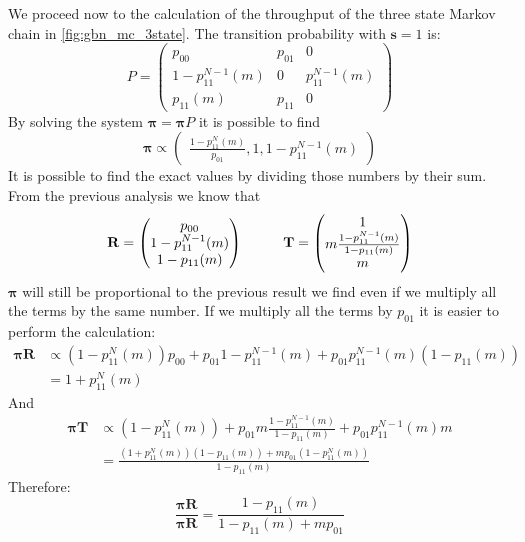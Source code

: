 We proceed now to the calculation of the throughput of the three state Markov chain in \autoref{fig:gbn_mc_3state}. The transition probability with $\mathbf{s} = 1$ is:
$$P=
\begin{pmatrix}
		p_{00} & p_{01} & 0 \\
		1-p_{11}^{N-1}(m) & 0 & p_{11}^{N-1}(m) \\
		p_{11}(m) & p_{11} & 0
\end{pmatrix} $$
By solving the system $\mathbf{\pi} = \mathbf{\pi}P$ it is possible to find
$$
	\mathbf{\pi} \propto
	\begin{pmatrix}
		\frac{1-p_{11}^N(m)}{p_{01}} , 1 , 1-p_{11}^{N-1}(m)
	\end{pmatrix}
$$
It is  possible to find the exact values by dividing those numbers by their sum. From the previous analysis we know that
$$\mathbf{R} =
\begin{pmatrix}
		p_{00}\\
	  1-p_{11}^{N-1}(m) \\
		1-p_{11}(m)
\end{pmatrix} \hspace{1 cm}
\mathbf{T} =
\begin{pmatrix}
		1 \\
		m \frac{1-p_{11}^{N-1}(m)}{1-p_{11}(m)} \\
		m
\end{pmatrix} $$
$\mathbf{\pi}$ will still be proportional to the previous result we find even if we multiply all the  terms by the same number. If we multiply all the terms by $p_{01}$ it is easier to perform the calculation:
\begin{equation}
	\begin{split}
		\mathbf{\pi}\mathbf{R} &\propto  (1-p_{11}^N(m))p_{00} + p_{01}1-p_{11}^{N-1}(m) + p_{01}p_{11}^{N-1}(m)(1-p_{11}(m))\\
		&= 1 + p_{11}^N(m)
	\end{split}
\end{equation}
And
\begin{equation}
	\begin{split}
		\mathbf{\pi}\mathbf{T} &\propto (1-p_{11}^N(m)) + p_{01}m\frac{1-p_{11}^{N-1}(m)}{1-p_{11}(m)} + p_{01}p_{11}^{N-1}(m)m\\
		&=\frac{(1 + p_{11}^N(m))(1-p_{11}(m))+mp_{01}(1-p_{11}^N(m))}{1-p_{11}(m)}
	\end{split}
\end{equation}
Therefore:
\begin{equation}
		\frac{\mathbf{\pi}\mathbf{R}}{\mathbf{\pi}\mathbf{R}} = \frac{1-p_{11}(m)}{1-p_{11}(m)+ mp_{01}}
\end{equation}

